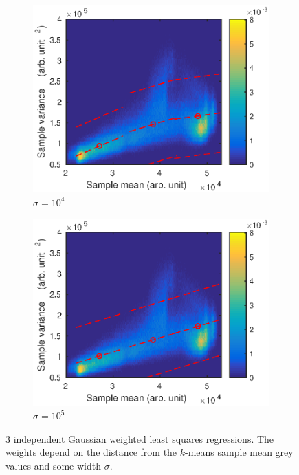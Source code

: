 \documentclass[12pt]{report}
\begin{document}
\begin{figure}
\begin{subfigure}{0.45\textwidth}
		\includegraphics[width=\textwidth]{figures/meanVar/gaussian_3.eps}
		\caption{$\sigma=10^4$}
	\end{subfigure}
	\begin{subfigure}{0.45\textwidth}
		\includegraphics[width=\textwidth]{figures/meanVar/gaussian_4.eps}
		\caption{$\sigma=10^5$}
	\end{subfigure}
	\caption{3 independent Gaussian weighted least squares regressions. The weights depend on the distance from the $k$-means sample mean grey values and some width $\sigma$.}
\end{figure}
\end{document}
